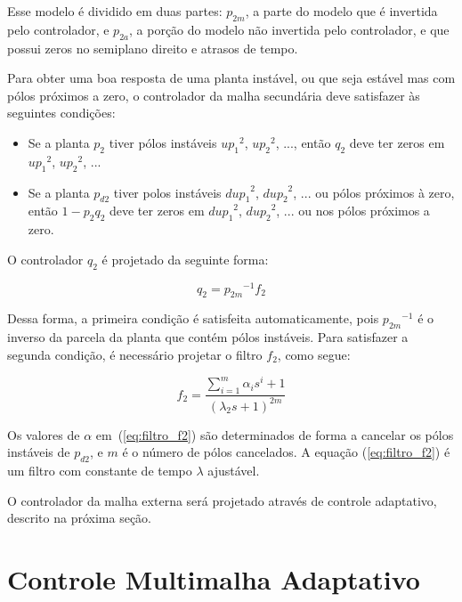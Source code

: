     Esse modelo é dividido em duas partes: $p_{2m}$, a parte do modelo que é invertida
    pelo controlador, e $p_{2a}$, a porção do modelo não invertida pelo controlador,
    e que possui zeros no semiplano direito e atrasos de tempo.

    Para obter uma boa resposta de uma planta instável, ou que seja estável mas com
    pólos próximos a zero, o controlador da malha secundária deve satisfazer às
    seguintes condições:

    \begin{itemize}
        \item Se a planta $p_2$ tiver pólos instáveis ${up_1}^2$, ${up_2}^2$, ...,
        então $q_2$ deve ter zeros em ${up_1}^2$, ${up_2}^2$, ...
        \item Se a planta $p_{d2}$ tiver polos instáveis ${dup_1}^2$, ${dup_2}^2$,
        ... ou pólos próximos à zero, então $1 - p_2 q_2$ deve ter zeros em
        ${dup_1}^2$, ${dup_2}^2$, ... ou nos pólos próximos a zero.
    \end{itemize}

    O controlador $q_2$ é projetado da seguinte forma:

    \begin{equation}
        q_2 = {p_{2m}}^{-1} f_2
    \end{equation}

    Dessa forma, a primeira condição é satisfeita automaticamente, pois ${p_{2m}}^{-1}$
    é o inverso da parcela da planta que contém pólos instáveis. Para satisfazer
    a segunda condição, é necessário projetar o filtro $f_2$, como segue:

    \begin{equation}
        f_2 = \frac{\sum_{i=1}^{m} \alpha_i s^i + 1}{(\lambda_2 s + 1)^{2m}}
        \label{eq:filtro_f2}
    \end{equation}

    Os valores de $\alpha$ em~(\ref{eq:filtro_f2}) são determinados de forma a
    cancelar os pólos instáveis de $p_{d2}$, e $m$ é o número de pólos cancelados.
    A equação (\ref{eq:filtro_f2}) é um filtro com constante de tempo $\lambda$
    ajustável.

    O controlador da malha externa será projetado através de controle adaptativo,
    descrito na próxima seção.


\section{Controle Multimalha Adaptativo}

